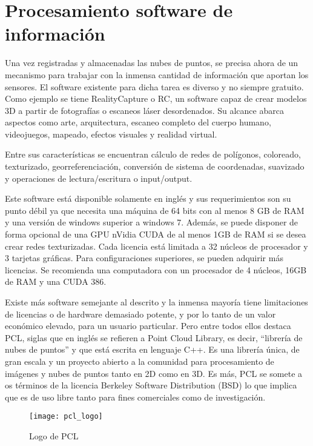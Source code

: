 \section{Procesamiento software de información}\label{librerias}

Una vez registradas y almacenadas las nubes de puntos, se precisa ahora de un mecanismo para trabajar con la inmensa cantidad de información que aportan los sensores. El software existente para dicha tarea es diverso y no siempre gratuito. Como ejemplo se tiene RealityCapture\cite{realitycapture} o RC, un software capaz de crear modelos 3D a partir de fotografías o escaneos láser desordenados. Su alcance abarca aspectos como arte, arquitectura, escaneo completo del cuerpo humano, videojuegos, mapeado, efectos visuales y realidad virtual.

Entre sus características se encuentran cálculo de redes de polígonos, coloreado, texturizado, georreferenciación, conversión de sistema de coordenadas, suavizado y operaciones de lectura/escritura o input/output.

Este software está disponible solamente en inglés y sus requerimientos son su punto débil ya que necesita una máquina de 64 bits con al menos 8 GB de RAM y una versión de windows superior a windows 7. Además, se puede disponer de forma opcional de una GPU nVidia CUDA de al menos 1GB de RAM si se desea crear redes texturizadas. Cada licencia está limitada a 32 núcleos de procesador y 3 tarjetas gráficas. Para configuraciones superiores, se pueden adquirir más licencias. Se recomienda una computadora con un procesador de 4 núcleos, 16GB de RAM y una CUDA 386.


Existe más software semejante al descrito y la inmensa mayoría tiene limitaciones de licencias o de hardware demasiado potente, y por lo tanto de un valor económico elevado, para un usuario particular. Pero entre todos ellos destaca PCL, siglas que en inglés se refieren a Point Cloud Library\cite{PCL}, es decir, ``librería de nubes de puntos'' y que está escrita en lenguaje C++. Es una librería única, de gran escala y un proyecto abierto a la comunidad para procesamiento de imágenes y nubes de puntos tanto en 2D como en 3D. Es más, PCL se somete a os términos de la licencia Berkeley Software Distribution (BSD) lo que implica que es de uso libre tanto para fines comerciales como de investigación. 

\begin{figure}
\centering
{}
  \texttt{[image: pcl\_logo]}
  \caption{Logo de PCL}\label{fig:pcl logo}
\endminipage\hfill
\end{figure}

